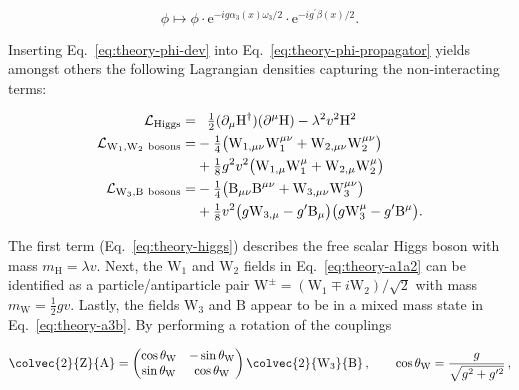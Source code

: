 \begin{equation}
\phi\mapsto\phi\cdot\mathrm{e}^{-ig\alpha_{3}(x)\omega_{3}/2}\cdot\mathrm{e}^{-ig^{\prime}\beta(x)/2}. \label{eq:theory-broken-u1-trans}
\end{equation}

Inserting Eq.~\ref{eq:theory-phi-dev} into Eq.~\ref{eq:theory-phi-propagator} yields amongst others the following Lagrangian densities capturing the non-interacting terms:

\begin{subequations}
\begin{align}
\mathcal{L}_\mathrm{Higgs}=&\hphantom{-}\tfrac{1}{2}(\partial_{\mu}\mathrm{H}^{\dagger})(\partial^{\mu}\mathrm{H})-\lambda^2 v^2 \mathrm{H}^2 \label{eq:theory-higgs} \\
\mathcal{L}_\mathrm{W_1,W_2~bosons}=&-\tfrac{1}{4}\big(\mathrm{W}_{1,\mu\nu}\mathrm{W}^{\mu\nu}_{1}+\mathrm{W}_{2,\mu\nu}\mathrm{W}^{\mu\nu}_{2}\big)\nonumber\\&+\tfrac{1}{8}g^2 v^2 \big(\mathrm{W}_{1,\mu} \mathrm{W}_{1}^{\mu}+\mathrm{W}_{2,\mu} \mathrm{W}_{2}^{\mu}\big) \label{eq:theory-a1a2} \\
\mathcal{L}_\mathrm{W_3,B~bosons}=&-\tfrac{1}{4}\big(\mathrm{B}_{\mu\nu}\mathrm{B}^{\mu\nu}+\mathrm{W}_{3,\mu\nu}\mathrm{W}^{\mu\nu}_{3}\big)\nonumber\\
&+\tfrac{1}{8}v^2 \big(g\mathrm{W}_{3,\mu}-g^{\prime}\mathrm{B}_\mu\big)\big(g\mathrm{W}_{3}^{\mu}-g^{\prime}\mathrm{B}^\mu\big) \label{eq:theory-a3b}.
\end{align}
\end{subequations}

The first term (Eq.~\ref{eq:theory-higgs}) describes the free scalar Higgs boson with mass $m_\mathrm{H}=\lambda v$. Next, the $\mathrm{W}_{1}$ and $\mathrm{W}_{2}$
fields in Eq.~\ref{eq:theory-a1a2} can be identified as a particle/antiparticle pair $\mathrm{W}^{\pm}=(\mathrm{W}_1\mp i\mathrm{W}_2)/\sqrt{2}$ with mass $m_\mathrm{W}=\frac{1}{2}gv$. Lastly, the fields $\mathrm{W}_3$ and $\mathrm{B}$ appear to be in a mixed mass state in Eq.~\ref{eq:theory-a3b}. By performing a rotation of the couplings

\begin{equation}
\colvec{2}{\mathrm{Z}}{\mathrm{A}}=\begin{pmatrix}
\cos\theta_\mathrm{W} & -\sin\theta_\mathrm{W} \\
\sin\theta_\mathrm{W} & \cos\theta_\mathrm{W}
\end{pmatrix}
\colvec{2}{\mathrm{W}_{3}}{\mathrm{B}}\,,\qquad \cos\theta_\mathrm{W}=\frac{g}{\sqrt{g^2+g^{\prime 2}}}\,,
\end{equation}

